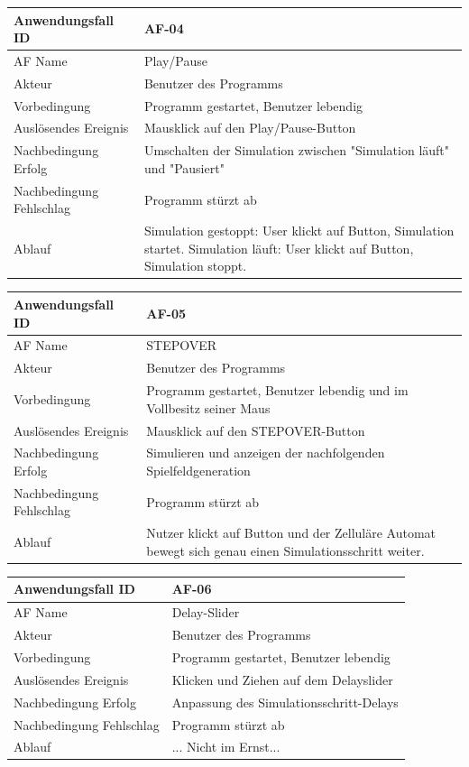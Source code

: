 \documentclass[11pt,a4paper]{article}
\begin{document}
\begin{tabular}[m]{|m{7cm}|m{9cm}|}
    \hline
    Anwendungsfall ID     & AF-04 \\
         \hline
    AF Name     &  Play/Pause \\
         \hline
    Akteur&Benutzer des Programms \\
    \hline
    Vorbedingung&Programm gestartet, Benutzer lebendig\\
    \hline
    Auslösendes Ereignis&Mausklick auf den Play/Pause-Button\\
    \hline
    Nachbedingung Erfolg&Umschalten der Simulation zwischen "Simulation läuft" und "Pausiert"\\
    \hline
    Nachbedingung Fehlschlag&Programm stürzt ab\\
    \hline
    Ablauf&Simulation gestoppt: User klickt auf Button, Simulation startet. Simulation läuft: User klickt auf Button, Simulation stoppt.\\
    \hline
\end{tabular}
\par


\begin{tabular}[m]{|m{7cm}|m{9cm}|}
    \hline
    Anwendungsfall ID     & AF-05 \\
         \hline
    AF Name     &  STEPOVER \\
         \hline
    Akteur&Benutzer des Programms \\
    \hline
    Vorbedingung&Programm gestartet, Benutzer lebendig und im Vollbesitz seiner Maus\\
    \hline
    Auslösendes Ereignis&Mausklick auf den STEPOVER-Button\\
    \hline
    Nachbedingung Erfolg& Simulieren und anzeigen der nachfolgenden Spielfeldgeneration\\
    \hline
    Nachbedingung Fehlschlag&Programm stürzt ab\\
    \hline
    Ablauf&Nutzer klickt auf Button und der Zelluläre Automat bewegt sich genau einen Simulationsschritt weiter.\\
    \hline
\end{tabular}
\par


\begin{tabular}[m]{|m{7cm}|m{9cm}|}
    \hline
    Anwendungsfall ID     & AF-06 \\
         \hline
    AF Name     &  Delay-Slider\\
         \hline
    Akteur&Benutzer des Programms \\
    \hline
    Vorbedingung&Programm gestartet, Benutzer lebendig\\
    \hline
    Auslösendes Ereignis&Klicken und Ziehen auf dem Delayslider\\
    \hline
    Nachbedingung Erfolg&Anpassung des Simulationsschritt-Delays\\
    \hline
    Nachbedingung Fehlschlag&Programm stürzt ab\\
    \hline
    Ablauf&... Nicht im Ernst...\\
    \hline
\end{tabular}
\par
\end{document}
